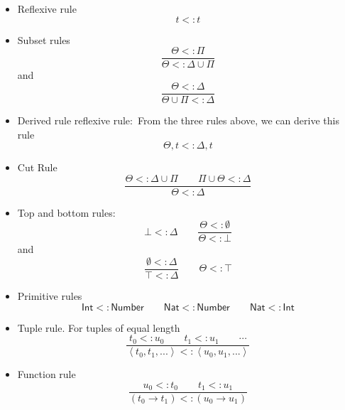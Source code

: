 \documentclass[12pt]{article}
\begin{document}
\begin{itemize}
\item Reflexive rule%
\begin{equation*}
t<:t
\end{equation*}

\item Subset rules%
\begin{equation*}
\frac{\Theta <:\Pi }{\Theta <:\Delta \cup \Pi }
\end{equation*}%
and%
\begin{equation*}
\frac{\Theta <:\Delta }{\Theta \cup \Pi <:\Delta }
\end{equation*}

\item Derived rule reflexive rule:\ From the three rules above, we can
derive this rule%
\begin{equation*}
\Theta ,t<:\Delta ,t
\end{equation*}

\item Cut Rule%
\begin{equation*}
\frac{\Theta <:\Delta \cup \Pi \qquad \Pi \cup \Theta <:\Delta }{\Theta
<:\Delta }
\end{equation*}

\item Top and bottom rules:%
\begin{equation*}
\bot <:\Delta \qquad \frac{\Theta <:\emptyset }{\Theta <:\bot }
\end{equation*}%
and%
\begin{equation*}
\frac{\emptyset <:\Delta }{\top <:\Delta }\qquad \Theta <:\top
\end{equation*}

\item Primitive rules%
\begin{equation*}
\mathsf{Int}<:\mathsf{Number}\qquad \mathsf{Nat}<:\mathsf{Number}\qquad 
\mathsf{Nat}<:\mathsf{Int}
\end{equation*}

\item Tuple rule. For tuples of equal length%
\begin{equation*}
\frac{t_{0}<:u_{0}\qquad t_{1}<:u_{1}\qquad \cdots }{\left\langle
t_{0},t_{1},...\right\rangle <:\left\langle u_{0},u_{1},...\right\rangle }
\end{equation*}

\item Function rule%
\begin{equation*}
\frac{u_{0}\mathsf{<:}t_{0}\qquad t_{1}\mathsf{<:}u_{1}}{\left(
t_{0}\rightarrow t_{1}\right) <:\left( u_{0}\rightarrow u_{1}\right) }
\end{equation*}


\end{itemize}
\end{document}
